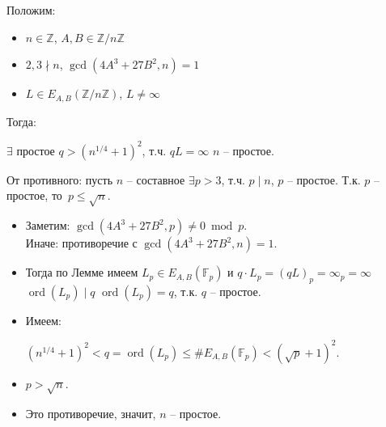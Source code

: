 \documentclass{beamer}
\begin{document}
\begin{frame}
   \begin{center}
	\begin{tcolorbox}[enhanced,hbox,colback=title-and-section-color!5,colframe=title-and-section-color!120,title= Теорема (Критерий простоты),center title]
		\begin{varwidth}{\textwidth}
			\label{t3}
			Положим:
			\begin{itemize}
				\item $n \in \mathbb{Z}$, $A, B \in \mathbb{Z}/n\mathbb{Z}$
				\item $2,3 \nmid n$, $\gcd(4A^3 + 27B^2, n)=1$
				\item $L \in E_{A,B}(\mathbb{Z}/n\mathbb{Z})$, $L\neq \infty$
			\end{itemize}
			 \vspace{0.5em}
			 Тогда:
			 
			 \vspace{0.1em}
				$\exists$ простое $q > (n^{1/4} + 1)^2$, т.ч. $qL = \infty$ \structure{$\implies$} $n$ -- простое.
		\end{varwidth}
	\end{tcolorbox}	
\end{center}
\end{frame}

\begin{frame}
\structure{$\triangleleft$}
От противного: пусть $n$ -- составное \structure{$\Rightarrow$} $\exists p > 3$, т.ч. $p \mid n$, $p$ -- простое. Т.к. $p$ -- простое, то~$p \leq \sqrt{n}$.
\begin{itemize}
    \item Заметим: $\gcd(4A^3 + 27B^2, p) \neq 0 \bmod p$.\\Иначе: противоречие с $\gcd(4A^3 + 27B^2, n) = 1$.
    \item Тогда по Лемме имеем $L_p \in E_{A,B}(\mathbb{F}_p)$ и $q\cdot L_p = (qL)_p = \infty_p = \infty$ \structure{$\Rightarrow$} $\operatorname{ord}(L_p) \mid q$ \structure{$\Rightarrow$} $\operatorname{ord}(L_p) = q$, т.к. $q$ -- простое.
    \item Имеем:

    $(n^{1/4} + 1)^2 < q = \operatorname{ord}(L_p) \leq \#E_{A,B}(\mathbb{F}_p) < (\sqrt{p} + 1)^2$.
    \item \structure{$\implies$} $p > \sqrt{n}$.
    \item Это противоречие, значит, $n$ -- простое. \structure{$\triangleright$}
\end{itemize}
\end{frame}
\end{document}
